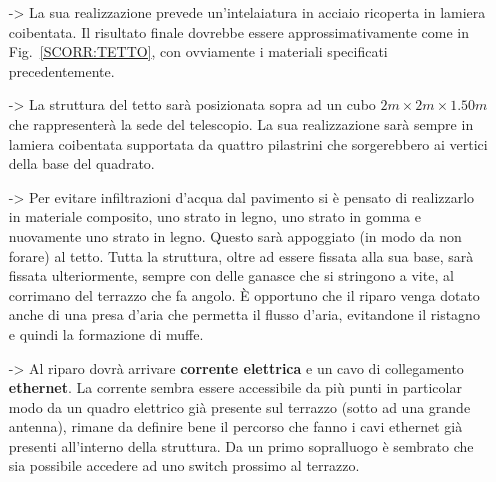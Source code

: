 \documentclass[a4paper,12pt]{article}
\begin{document}
\begin{itemize}
	\item[->]La sua realizzazione prevede un'intelaiatura in acciaio ricoperta in lamiera coibentata. Il risultato finale dovrebbe essere approssimativamente come in Fig.~\ref{SCORR:TETTO}, con ovviamente i materiali specificati precedentemente.

	\item[->]La struttura del tetto sar\`a posizionata sopra ad un cubo $2m\times2m\times1.50m$ che rappresenter\`a la sede del telescopio. La sua realizzazione sar\`a sempre in lamiera coibentata supportata da quattro pilastrini che sorgerebbero ai vertici della base del quadrato.

	\item[->]Per evitare infiltrazioni d'acqua dal pavimento si \`e pensato di realizzarlo in  materiale composito, uno strato in legno, uno strato in gomma e nuovamente uno strato in legno. Questo sar\`a appoggiato (in modo da non forare) al tetto. Tutta la struttura, oltre ad essere fissata alla sua base, sar\`a fissata ulteriormente, sempre con delle ganasce che si stringono a vite, al corrimano del terrazzo che fa angolo. \`E opportuno che il riparo venga dotato anche di una presa d'aria che permetta il flusso d'aria, evitandone il ristagno e quindi la formazione di muffe.

	\item[->]Al riparo dovr\`a arrivare \textbf{corrente elettrica} e un cavo di collegamento \textbf{ethernet}. La corrente sembra essere accessibile da pi\`u punti in particolar modo da un quadro elettrico gi\`a presente sul terrazzo (sotto ad una grande antenna), rimane da definire bene il percorso che fanno i cavi ethernet gi\`a presenti all'interno della struttura. Da un primo sopralluogo \`e sembrato che sia possibile accedere ad uno switch prossimo al terrazzo.
\end{itemize}
\end{document}
